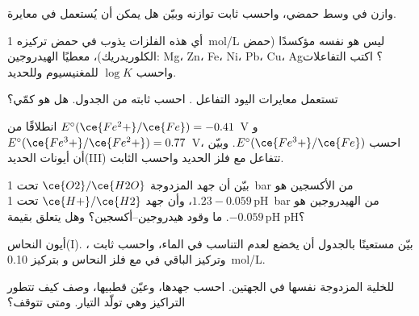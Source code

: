 \begin{exercise}[$\star\star$]\label{exo:b1:nernst:5}
وازن  في وسط حمضي، واحسب ثابت توازنه
وبيّن هل يمكن أن يُستعمل في معايرة.
\end{exercise}

\begin{exercise}[$\star\star$]\label{exo:b1:nernst:6}
أي هذه الفلزات يذوب في حمض تركيزه \qty{1}{mol/L} ليس هو
نفسه مؤكسدًا (حمض الكلوريدريك)، معطيًا الهيدروجين: Mg، Zn، Fe، Ni،
Pb، Cu، Ag؟ اكتب التفاعلات واحسب $\log K$ للمغنيسيوم
وللحديد.
\end{exercise}

\begin{exercise}[$\star\star$]\label{exo:b1:nernst:7}
تستعمل معايرات اليود التفاعل . احسب
ثابته من الجدول. هل هو كمّي؟
\end{exercise}

\begin{exercise}[$\star\star$]\label{exo:b1:nernst:8}
انطلاقًا من $E^\circ(\ce{Fe^2+}/\ce{Fe}) = -0.41$~V و$E^\circ(\ce{Fe^3+}/\ce{Fe^2+})
= 0.77$~V، احسب $E^\circ(\ce{Fe^3+}/\ce{Fe})$. وبيّن أن أيونات الحديد(III)
تتفاعل مع فلز الحديد واحسب الثابت.
\end{exercise}

\begin{exercise}[$\star\star$]\label{exo:b1:nernst:9}
بيّن أن جهد المزدوجة $\ce{O2}/\ce{H2O}$ تحت \qty{1}{bar}
من الأكسجين هو $1.23 - 0.059\,\mathrm{pH}$، وأن جهد $\ce{H+}/\ce{H2}$
تحت \qty{1}{bar} من الهيدروجين هو $-0.059\,\mathrm{pH}$. ما
 وقود هيدروجين--أكسجين؟ وهل يتعلق بقيمة pH؟
\end{exercise}

\begin{exercise}[$\star\star\star$]\label{exo:b1:nernst:10}
أيون النحاس(I). بيّن مستعينًا بالجدول أن  يخضع لعدم التناسب
في الماء، واحسب ثابت ،
وتركيز  الباقي في  مع فلز النحاس
و بتركيز \qty{0.10}{mol/L}.
\end{exercise}

\begin{exercise}[$\star\star\star$]\label{exo:b1:nernst:11}
للخلية  المزدوجة نفسها في الجهتين.
احسب جهدها، وعيّن قطبيها، وصف كيف تتطور
التراكيز وهي تولّد التيار. ومتى تتوقف؟
\end{exercise}

